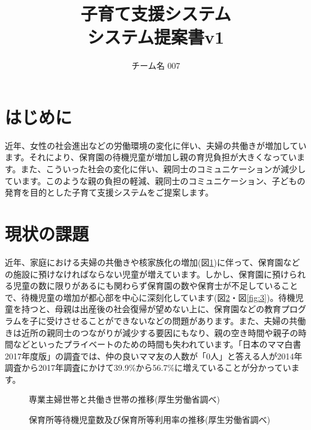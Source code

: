 \documentclass[a4j]{jarticle}
\title{
\vspace{30mm}
{\bf 子育て支援システム}
\\
\vspace{5mm}
{\bf システム提案書v1\\
}
\vspace{120mm}
}
\author{
\vspace{5mm}
チーム名 007\\
\vspace{5mm}
}
\begin{document}
\maketitle
\tableofcontents
\newpage

\section{はじめに}
近年、女性の社会進出などの労働環境の変化に伴い、夫婦の共働きが増加しています。それにより、保育園の待機児童が増加し親の育児負担が大きくなっています。また、こういった社会の変化に伴い、親同士のコミュニケーションが減少しています。このような親の負担の軽減、親同士のコミュニケーション、子どもの発育を目的とした子育て支援システムをご提案します。

\section{現状の課題}
近年、家庭における夫婦の共働きや核家族化の増加(図\ref{fig:1})\cite{bib:tomo}に伴って、保育園などの施設に預けなければならない児童が増えています。しかし、保育園に預けられる児童の数に限りがあるにも関わらず保育園の数や保育士が不足していることで、待機児童の増加が都心部を中心に深刻化しています(図\ref{fig:2}・図\ref{fig:3})\cite{bib:taiki}。待機児童を持つと、母親は出産後の社会復帰が望めない上に、保育園などの教育プログラムを子に受けさせることができないなどの問題があります。また、夫婦の共働きは近所の親同士のつながりが減少する要因にもなり、親の空き時間や親子の時間などといったプライベートのための時間も失われています。「日本のママ白書2017年度版」\cite{bib:mama}の調査では、仲の良いママ友の人数が「0人」と答える人が2014年調査から2017年調査にかけて39.9\%から56.7\%に増えていることが分かっています。

\begin{figure}[H]
\begin{center}
\caption{専業主婦世帯と共働き世帯の推移(厚生労働省調べ)}
\label{fig:1}
\end{center}
\end{figure}

\begin{figure}[H]
\begin{center}
\caption{保育所等待機児童数及び保育所等利用率の推移(厚生労働省調べ)}
\label{fig:2}
\end{center}
\end{figure}
\end{document}
